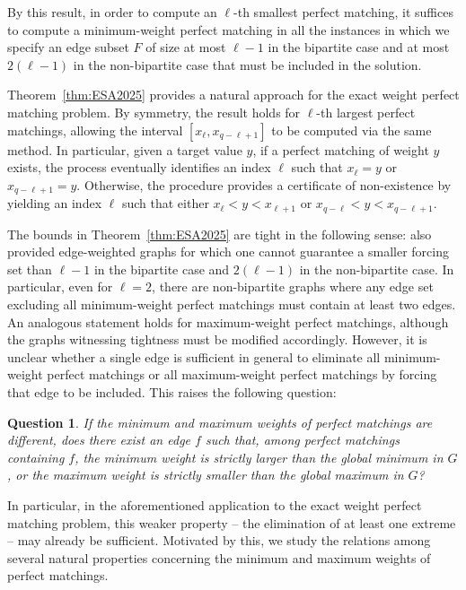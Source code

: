 \documentclass{article}
\theoremstyle{plain}
\newtheorem{qu}[thm]{Question}
\theoremstyle{definition}
\begin{document}
By this result, in order to compute an $\ell$-th smallest perfect matching, it suffices to compute a minimum-weight perfect matching in all the instances in which we specify an edge subset $F$ of size at most $\ell - 1$ in the bipartite case and at most $2(\ell - 1)$ in the non-bipartite case that must be included in the solution. 

Theorem~\ref{thm:ESA2025} provides a natural approach for the exact weight perfect matching problem. By symmetry, the result holds for $\ell$-th largest perfect matchings, allowing the interval $[x_\ell, x_{q-\ell+1}]$ to be computed via the same method. In particular, given a target value $y$, if a perfect matching of weight $y$ exists, the process eventually identifies an index $\ell$ such that $x_\ell = y$ or $x_{q-\ell+1} = y$. Otherwise, the procedure provides a certificate of non-existence by yielding an index $\ell$ such that either $x_\ell < y < x_{\ell+1}$ or $x_{q-\ell} < y < x_{q-\ell+1}$.

The bounds in Theorem~\ref{thm:ESA2025} are tight in the following sense: \cite{maalouly2025finding} also provided edge-weighted graphs for which one cannot guarantee a smaller forcing set than $\ell-1$ in the bipartite case and $2(\ell-1)$ in the non-bipartite case. In particular, even for $\ell=2$, there are non-bipartite graphs where any edge set excluding all minimum-weight perfect matchings must contain at least two edges. An analogous statement holds for maximum-weight perfect matchings, although the graphs witnessing tightness must be modified accordingly. However, it is unclear whether a single edge is sufficient in general to eliminate all minimum-weight perfect matchings or all maximum-weight perfect matchings by forcing that edge to be included. This raises the following question:

\begin{qu}\label{qu:origin}
    If the minimum and maximum weights of perfect matchings are different, does there exist an edge $f$ such that, among perfect matchings containing $f$, the minimum weight is strictly larger than the global minimum in $G$, or the maximum weight is strictly smaller than the global maximum in $G$?
\end{qu}
In particular, in the aforementioned application to the exact weight perfect matching problem, this weaker property -- the elimination of at least one extreme -- may already be sufficient. Motivated by this, we study the relations among several natural properties concerning the minimum and maximum weights of perfect matchings.
\end{document}

